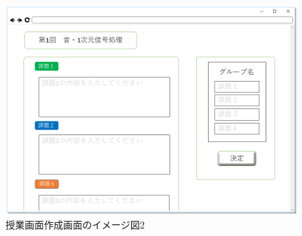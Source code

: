 \begin{figure}[htbp]
\begin{center}
  \includegraphics[width=1\linewidth,clip]{./img/sc_class_creat2.png}
  \caption{授業画面作成画面のイメージ図2}\label{fig:sc_class_creat2}
\end{center}
\end{figure}
